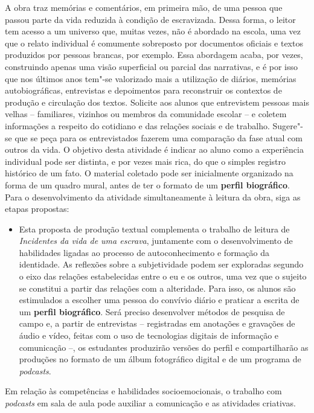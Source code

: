 \documentclass[12pt]{extarticle}
\begin{document}
A obra traz memórias e comentários, em primeira mão, de uma
pessoa que passou parte da vida reduzida à condição de escravizada.
Dessa forma, o leitor tem acesso a um universo que, muitas vezes, não é
abordado na escola, uma vez que o relato individual é comumente
sobreposto por documentos oficiais e textos produzidos por pessoas
brancas, por exemplo. Essa abordagem acaba, por vezes, construindo
apenas uma visão superficial ou parcial das narrativas, e é por isso que
nos últimos anos tem"-se valorizado mais a utilização de diários,
memórias autobiográficas, entrevistas e depoimentos para reconstruir os
contextos de produção e circulação dos textos. Solicite aos alunos que
entrevistem pessoas mais velhas -- familiares, vizinhos ou membros da
comunidade escolar -- e coletem informações a respeito do cotidiano e
das relações sociais e de trabalho. Sugere"-se que se peça para os
entrevistados fazerem uma comparação da fase atual com outros da vida. O
objetivo desta atividade é indicar ao aluno como a experiência
individual pode ser distinta, e por vezes mais rica, do que o simples
registro histórico de um fato. O material coletado pode ser inicialmente
organizado na forma de um quadro mural, antes de ter o formato de um
\textbf{perfil biográfico}. Para o desenvolvimento da atividade
simultaneamente à leitura da obra, siga as etapas propostas:

\begin{itemize}
\item
  Esta proposta de produção textual complementa o trabalho de leitura de
  \emph{Incidentes da vida de uma escrava}, juntamente com o
  desenvolvimento de habilidades ligadas ao processo de autoconhecimento
  e formação da identidade. As reflexões sobre a subjetividade podem ser
  exploradas segundo o eixo das relações estabelecidas entre o eu e os
  outros, uma vez que o sujeito se constitui a partir das relações com a
  alteridade. Para isso, os alunos são estimulados a escolher uma pessoa
  do convívio diário e praticar a escrita de um \textbf{perfil
  biográfico}. Será preciso desenvolver métodos de pesquisa de campo e,
  a partir de entrevistas -- registradas em anotações e gravações de
  áudio e vídeo, feitas com o uso de tecnologias digitais de informação
  e comunicação --, os estudantes produzirão versões do perfil e
  compartilharão as produções no formato de um álbum fotográfico digital
  e de um programa de \emph{podcasts}.
\end{itemize}

Em relação às competências e habilidades socioemocionais, o trabalho com
\emph{podcasts} em sala de aula pode auxiliar a comunicação e as
atividades criativas.
\end{document}

